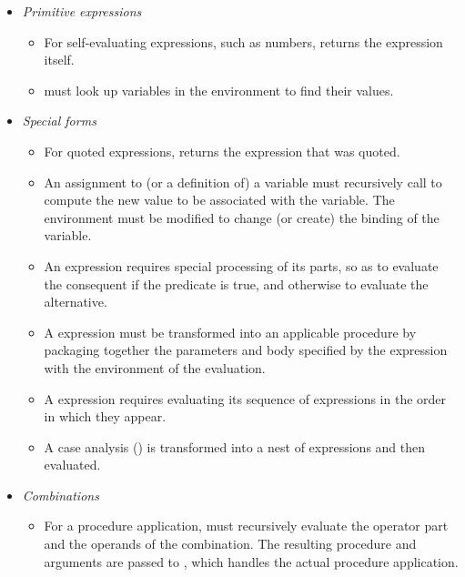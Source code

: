 \begin{itemize}[leftmargin=*]
	\item
		\textit{Primitive expressions}
		\begin{itemize}

			\item
				For self-evaluating expressions, such as numbers,  returns the expression itself.

			\item
				 must look up variables in the environment to find their values.

		\end{itemize}

	\item
		\textit{Special forms}
		\begin{itemize}

			\item
				For quoted expressions,  returns the expression that was quoted.

			\item
				An assignment to (or a definition of) a variable must recursively call  to compute the new value to be associated with the variable.
				The environment must be modified to change (or create) the binding of the variable.

			\item
				An  expression requires special processing of its parts, so as to evaluate the consequent if the predicate is true, and otherwise to evaluate the alternative.

			\item
				A  expression must be transformed into an applicable procedure by packaging together the parameters and body specified by the  expression with the environment of the evaluation.

			\item
				A  expression requires evaluating its sequence of expressions in the order in which they appear.

			\item
				A case analysis () is transformed into a nest of  expressions and then evaluated.

		\end{itemize}

	\item
		\textit{Combinations}
		\begin{itemize}

			\item
				For a procedure application,  must recursively evaluate the operator part and the operands of the combination.
				The resulting procedure and arguments are passed to , which handles the actual procedure application.

		\end{itemize}
\end{itemize}
